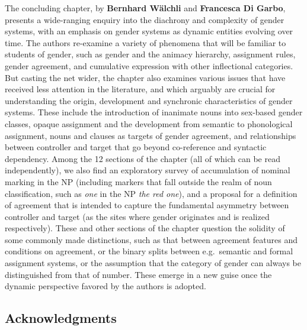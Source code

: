 \documentclass[output=collectionpaper]{langsci/langscibook}
\begin{document}
The concluding chapter, by \textbf{Bernhard Wälchli} and \textbf{Francesca Di Garbo}, pre\-sents a wide-ranging enquiry into the diachrony and complexity of gender systems, with an emphasis on gender systems as dynamic entities evolving over time. The authors re-examine a variety of phenomena that will be familiar to students of gender, such as gender and the animacy hierarchy, assignment rules, gender agreement, and cumulative expression with other inflectional categories. But casting the net wider, the chapter also examines various issues that have received less attention in the literature, and which arguably are crucial for understanding the origin, development and synchronic characteristics of gender systems. These include the introduction of inanimate nouns into sex-based gender classes, opaque assignment and the development from semantic to phonological assignment, nouns \textendash{} and clauses \textendash{} as targets of gender agreement, and relationships between controller and target that go beyond co-reference and syntactic dependency. Among the 12 sections of the chapter (all of which can be read independently), we also find an exploratory survey of accumulation of nominal marking in the NP (including markers that fall outside the realm of noun classification, such as \textit{one} in the NP \textit{the red one}), and a proposal for a definition of agreement that is intended to capture the fundamental asymmetry between controller and target (as the sites where gender originates and is realized respectively). These and other sections of the chapter question the solidity of some commonly made distinctions, such as that between agreement features and conditions on agreement, or the binary splits between e.g.\ semantic and formal assignment systems, or the assumption that the category of gender can always be distinguished from that of number. These emerge in a new guise once the dynamic perspective favored by the authors is adopted.

\subsection*{Acknowledgments}
\end{document}
